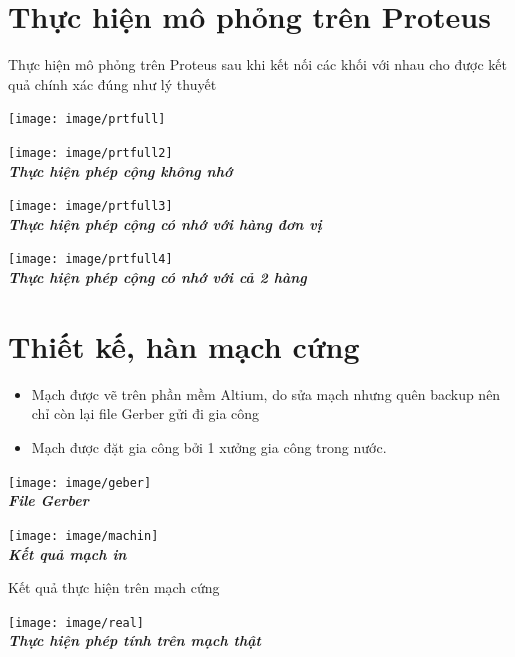 \documentclass[10pt,a4paper]{report}
\begin{document}
\section{Thực hiện mô phỏng trên Proteus}
Thực hiện mô phỏng trên Proteus sau khi kết nối các khối với nhau cho được kết quả chính xác đúng như lý thuyết
\begin{center}
	\texttt{[image: image/prtfull]}
\end{center}
\vspace{1cm}
\begin{center}
	\texttt{[image: image/prtfull2]}\\
	\textbf{\textit{Thực hiện phép cộng không nhớ}}
\end{center}
\vspace{1cm}
\begin{center}
	\texttt{[image: image/prtfull3]}\\
	\textbf{\textit{Thực hiện phép cộng có nhớ với hàng đơn vị}}
\end{center}
\vspace{1cm}
\begin{center}
	\texttt{[image: image/prtfull4]}\\
	\textbf{\textit{Thực hiện phép cộng có nhớ với cả 2 hàng}}
\end{center}
\newpage
\section{Thiết kế, hàn mạch cứng}
\begin{itemize}
	\item Mạch được vẽ trên phần mềm Altium, do sửa mạch nhưng quên backup nên chỉ còn lại file Gerber gửi đi gia công
	\item Mạch được đặt gia công bởi 1 xưởng gia công trong nước.
\end{itemize}
\begin{multicols}{2}
\begin{center}
	\texttt{[image: image/geber]}\\
	\textbf{\textit{File Gerber}}
\end{center}

\begin{center}
	\texttt{[image: image/machin]}\\
	\textbf{\textit{Kết quả mạch in}}
\end{center}
\end{multicols}
\vspace{2cm}
Kết quả thực hiện trên mạch cứng
\begin{center}
	\texttt{[image: image/real]}\\
	\textbf{\textit{Thực hiện phép tính trên mạch thật}}
\end{center}
\newpage
\end{document}
